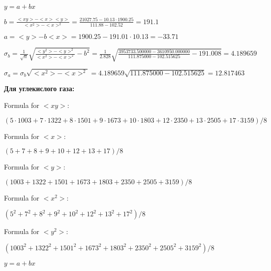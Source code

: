 \documentclass[12pt,a4paper]{article}
\begin{document}
$y = a + bx$
\vspace{0.5cm}

$b = \frac{<xy> - <x><y>}{<x^2> - <x>^2} = \frac{21027.75 - 10.13 \cdot 1900.25}{111.88 - 102.52} = 191.1$
\vspace{0.5cm}

$a =<y> - b<x> = 1900.25 - 191.01 \cdot 10.13 = -33.71$
\vspace{0.5cm}

$\sigma_b = \frac{1}{\sqrt{n}} \sqrt { \frac{<y^2> - <y>^2}{<x^2> - <x>^2}  - b^2} = \frac{1}{2.828} \sqrt {\frac{3953733.500000 - 3610950.000000}{111.875000 - 102.515625} - 191.008} = 4.189659$
\vspace{0.5cm}

$\sigma_a = \sigma_b \sqrt{<x^2> - <x>^2} = 4.189659 \sqrt{111.875000 - 102.515625} = 12.817463$
\vspace{0.5cm}


\textbf{Для углекислого газа:}

\vspace{0.5cm}

Formula for $<xy>:$
\vspace{0.5cm}

$(5 \cdot 1003 + 7 \cdot 1322 + 8 \cdot 1501 + 9 \cdot 1673 + 10 \cdot 1803 + 12 \cdot 2350 + 13 \cdot 2505 + 17 \cdot 3159) / 8$
\vspace{0.5cm}

Formula for $<x>:$
\vspace{0.5cm}

$(5 + 7 + 8 + 9 + 10 + 12 + 13 + 17) / 8$
\vspace{0.5cm}

Formula for $<y>:$
\vspace{0.5cm}

$(1003 + 1322 + 1501 + 1673 + 1803 + 2350 + 2505 + 3159) / 8$
\vspace{0.5cm}

Formula for $<x^2>$:
\vspace{0.5cm}

$(5^2 + 7^2 + 8^2 + 9^2 + 10^2 + 12^2 + 13^2 + 17^2) / 8$
\vspace{0.5cm}

Formula for $<y^2>:$
\vspace{0.5cm}

$(1003^2 + 1322^2 + 1501^2 + 1673^2 + 1803^2 + 2350^2 + 2505^2 + 3159^2) / 8$
\vspace{0.5cm}



$y = a + bx$
\vspace{0.5cm}
\end{document}
